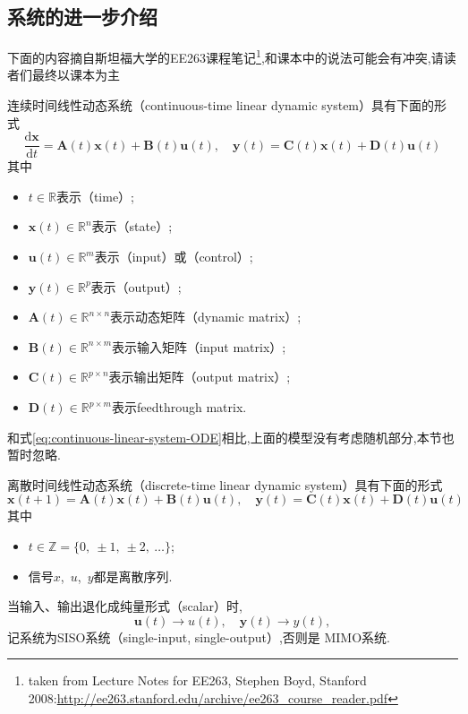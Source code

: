 \documentclass[cn,10pt,citestyle=gb7714-2015,bibstyle=gb7714-2015]{elegantbook}
\begin{document}
\subsection{系统的进一步介绍}\label{ssec:system-more}
\begin{note}
  下面的内容摘自斯坦福大学的EE263课程笔记\footnote{taken from Lecture Notes for EE263,
  Stephen Boyd, Stanford 2008:\url{http://ee263.stanford.edu/archive/ee263_course_reader.pdf}},和课本中的说法可能会有冲突,请读者们最终以课本为主
\end{note}
\begin{proposition}[线性动态系统]\label{pro:LDS}
  连续时间线性动态系统（continuous-time linear dynamic system）具有下面的形式
  \[
      \frac{\mathrm{d}\bm{x}}{\mathrm{d}t}=\bm{A}(t)\bm{x}(t)+\bm{B}(t)\bm{u}(t),\quad \bm{y}(t)=\bm{C}(t)\bm{x}(t)+\bm{D}(t)\bm{u}(t)
  \]
  其中
  \begin{itemize}
    \item $t\in\mathbb{R}$表示（time）;
    \item $\bm{x}(t)\in\mathbb{R}^n$表示（state）;
    \item $\bm{u}(t)\in\mathbb{R}^m$表示（input）或（control）;
    \item $\bm{y}(t)\in\mathbb{R}^p$表示（output）;
    \item $\bm{A}(t)\in\mathbb{R}^{n\times n}$表示动态矩阵（dynamic matrix）;
    \item $\bm{B}(t)\in\mathbb{R}^{n\times m}$表示输入矩阵（input matrix）;
    \item $\bm{C}(t)\in\mathbb{R}^{p\times n}$表示输出矩阵（output matrix）;
    \item $\bm{D}(t)\in\mathbb{R}^{p\times m}$表示feedthrough matrix.
  \end{itemize}
  和式\eqref{eq:continuous-linear-system-ODE}相比,上面的模型没有考虑随机部分,本节也暂时忽略.

  离散时间线性动态系统（discrete-time linear dynamic system）具有下面的形式
  \[
      \bm{x}(t+1)=\bm{A}(t)\bm{x}(t)+\bm{B}(t)\bm{u}(t),\quad \bm{y}(t)=\bm{C}(t)\bm{x}(t)+\bm{D}(t)\bm{u}(t)
  \]
  其中
  \begin{itemize}
    \item $t\in\mathbb{Z}=\{0,\ \pm 1,\ \pm 2,\ \ldots\}$;
    \item 信号$x$,\ $u$,\ $y$都是离散序列.
  \end{itemize}
\end{proposition}
当输入、输出退化成纯量形式（scalar）时,
\[
  \bm{u}(t)\to u(t),\quad\bm{y}(t)\to y(t),
\]记系统为SISO系统（single-input, single-output）,否则是
MIMO系统.
\end{document}
